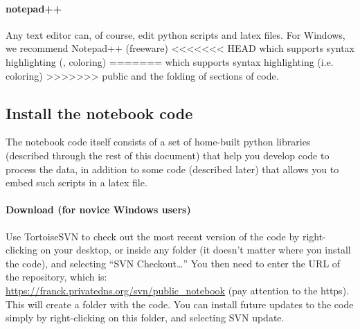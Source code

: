\paragraph{notepad++}
Any text editor can, of course, edit
    python scripts and latex files.
For Windows,
    we recommend Notepad++ (freeware)
<<<<<<< HEAD
    which supports syntax highlighting (\ie, coloring)
=======
    which supports syntax highlighting (i.e. coloring)
>>>>>>> public
    and the folding of sections of code.
\subsection{Install the notebook code}
The notebook code itself consists of a set of home-built
    python libraries
    (described through the rest of this document)
    that help you develop code to process the data,
    in addition to some code (described later)
    that allows you to embed such scripts in a latex file.
\paragraph{Download (for novice Windows users)}
Use TortoiseSVN to check out the
    most recent version of the code
    by right-clicking on your desktop,
    or inside any folder
    (it doesn't matter where you install the code),
    and selecting ``SVN Checkout\ldots''
You then need to enter the URL of the repository, which is:
    \\ \url{https://franck.privatedns.org/svn/public\_notebook}
    (pay attention to the https).\\ 
This will create a folder with the code.
You can install future updates to the code
    simply by right-clicking on this folder,
    and selecting SVN update.
